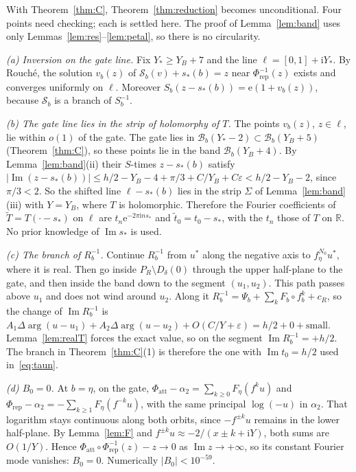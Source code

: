 \documentclass[11pt]{amsart}
\theoremstyle{definition}
\newcommand{\Rr}{R}
\newcommand{\eee}{\mathrm{e}}
\newcommand{\ii}{\mathrm{i}}
\begin{document}
With Theorem~\ref{thm:C}, Theorem~\ref{thm:reduction} becomes unconditional.
Four points need checking; each is settled here.  The proof of
Lemma~\ref{lem:band} uses only Lemmas~\ref{lem:res}--\ref{lem:petal}, so there is
no circularity.

\emph{(a) Inversion on the gate line.}  Fix $Y_*\ge Y_B+7$ and the line
$\ell=[0,1]+\ii Y_*$.  By Rouch\'e, the solution $v_b(z)$ of
$\mathcal S_b(v)+s_*(b)=z$ near $\Phi_{\mathrm{rep}}^{-1}(z)$ exists and converges
uniformly on $\ell$.  Moreover $S_b(z-s_*(b))=\eee(1+v_b(z))$, because $\mathcal S_b$
is a branch of $S_b^{-1}$.

\emph{(b) The gate line lies in the strip of holomorphy of $T$.}  The points
$v_b(z)$, $z\in\ell$, lie within $o(1)$ of the gate.  The gate lies in
$\mathcal B_b(Y_*-2)\subset\mathcal B_b(Y_B+5)$ (Theorem~\ref{thm:C}), so these
points lie in the band $\mathcal B_b(Y_B+4)$.
By Lemma~\ref{lem:band}(ii) their $S$-times $z-s_*(b)$ satisfy
$|\operatorname{Im}(z-s_*(b))|\le h/2-Y_B-4+\pi/3+C/Y_B+C\varepsilon<h/2-Y_B-2$,
since $\pi/3<2$.  So the
shifted line $\ell-s_*(b)$ lies in the strip $\Sigma$ of Lemma~\ref{lem:band}(iii)
with $Y=Y_B$, where $T$ is holomorphic.  Therefore the Fourier coefficients of
$\tilde T=T(\cdot-s_*)$ on $\ell$ are $t_n\eee^{-2\pi\ii ns_*}$ and
$\tilde t_0=t_0-s_*$, with the $t_n$ those of $T$ on $\mathbb R$.  No prior
knowledge of $\operatorname{Im}s_*$ is used.

\emph{(c) The branch of $\Rr_b^{-1}$.}  Continue $\Rr_b^{-1}$ from $u^*$ along
the negative axis to $f_\eta^{N_0}u^*$, where it is real.  Then go inside
$P_R\setminus D_\delta(0)$ through the upper half-plane to the gate, and then
inside the band down to the segment $(u_1,u_2)$.  This path passes above $u_1$
and does not wind around $u_2$.  Along it $\Rr_b^{-1}=\Psi_b+\sum_kF_b\circ f_b^k+c_R$, so the change of
$\operatorname{Im}\Rr_b^{-1}$ is
$A_1\Delta\arg(u-u_1)+A_2\Delta\arg(u-u_2)+O(C/Y+\varepsilon)=h/2+0+\text{small}$.
Lemma~\ref{lem:realT} forces the exact value, so on the segment
$\operatorname{Im}\Rr_b^{-1}=+h/2$.  The branch in
Theorem~\ref{thm:C}(1) is therefore the one with $\operatorname{Im}t_0=h/2$ used
in~\eqref{eq:taun}.

\emph{(d) $B_0=0$.}  At $b=\eta$, on the gate,
$\Phi_{\mathrm{att}}-\alpha_2=\sum_{k\ge0}F_\eta(f^ku)$ and
$\Phi_{\mathrm{rep}}-\alpha_2=-\sum_{k\ge1}F_\eta(f^{-k}u)$, with the same
principal $\log(-u)$ in $\alpha_2$.  That logarithm stays continuous along both
orbits, since $-f^{\pm k}u$ remains in the lower half-plane.  By
Lemma~\ref{lem:F} and $f^{\pm k}u\approx-2/(x\pm k+\ii Y)$, both sums are
$O(1/Y)$.  Hence $\Phi_{\mathrm{att}}\circ\Phi_{\mathrm{rep}}^{-1}(z)-z\to0$ as
$\operatorname{Im}z\to+\infty$, so its constant Fourier mode vanishes:
$B_0=0$.  Numerically $|B_0|<10^{-59}$.
\end{document}
